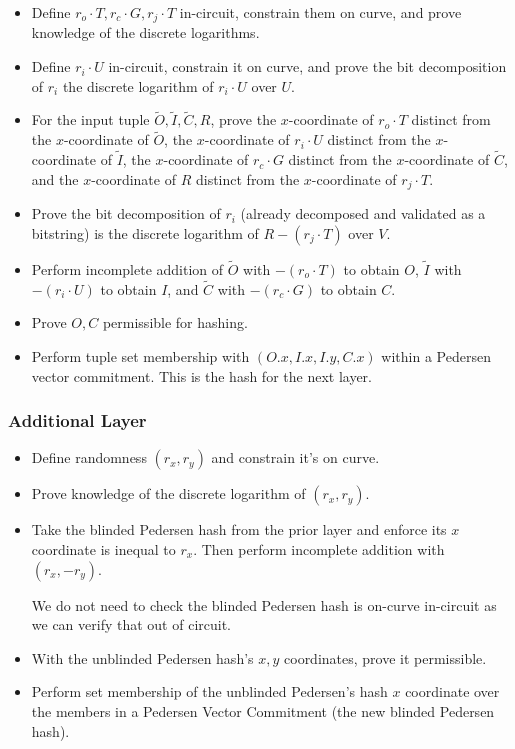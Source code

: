 \documentclass[]{article}
\begin{document}
\begin{itemize}
	\item Define $r_o \cdot T, r_c \cdot G, r_j \cdot T$ in-circuit, constrain them on curve, and prove knowledge of the discrete logarithms.
	\item Define $r_i \cdot U$ in-circuit, constrain it on curve, and prove the bit decomposition of $r_i$ the discrete logarithm of $r_i \cdot U$ over $U$.
	\item For the input tuple $\tilde{O}, \tilde{I}, \tilde{C}, R$, prove the $x$-coordinate of $r_o \cdot T$ distinct from the $x$-coordinate of $\tilde{O}$, the $x$-coordinate of $r_i \cdot U$ distinct from the $x$-coordinate of $\tilde{I}$, the $x$-coordinate of $r_c \cdot G$ distinct from the $x$-coordinate of $\tilde{C}$, and the $x$-coordinate of $R$ distinct from the $x$-coordinate of $r_j \cdot T$.
	\item Prove the bit decomposition of $r_i$ (already decomposed and validated as a bitstring) is the discrete logarithm of $R - (r_j \cdot T)$ over $V$.
	\item Perform incomplete addition of $\tilde{O}$ with $-(r_o \cdot T)$ to obtain $O$, $\tilde{I}$ with $-(r_i \cdot U)$ to obtain $I$, and $\tilde{C}$ with $-(r_c \cdot G)$ to obtain $C$.
	\item Prove $O, C$ permissible for hashing.
	\item Perform tuple set membership with $(O.x, I.x, I.y, C.x)$ within a Pedersen vector commitment. This is the hash for the next layer.
\end{itemize}

\subsubsection{Additional Layer}

\begin{itemize}
	\item Define randomness $(r_x, r_y)$ and constrain it's on curve.
	\item Prove knowledge of the discrete logarithm of $(r_x, r_y)$.
	\item Take the blinded Pedersen hash from the prior layer and enforce its $x$ coordinate is inequal to $r_x$. Then perform incomplete addition with $(r_x, -r_y)$.
	
	We do not need to check the blinded Pedersen hash is on-curve in-circuit as we can verify that out of circuit.
	\item With the unblinded Pedersen hash's $x, y$ coordinates, prove it permissible.
	\item Perform set membership of the unblinded Pedersen's hash $x$ coordinate over the members in a Pedersen Vector Commitment (the new blinded Pedersen hash).
\end{itemize}
\end{document}
